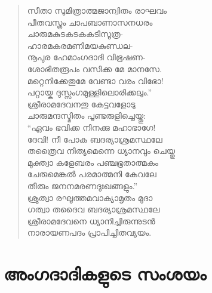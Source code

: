 \begin{verse}
സീതാ സുമിത്രാത്മജാന്വിതം രാഘവം\\
പീതവസ്ത്രം ചാപബാണാസനധരം\\
ചാരുമകുടകടകകടിസൂത്ര-\\
ഹാരമകരമണിമയകുണ്ഡല-\\
നൂപുര ഹേമാംഗദാദി വിഭൂഷണ-\\
ശോഭിതരൂപം വസിക്ക മേ മാനസേ.\\
മറ്റെനിക്കേതുമേ വേണ്ടാ വരം വിഭോ!\\
പറ്റായ്ക ദുസ്സംഗമുള്ളിലൊരിക്കലും.”\\
ശ്രീരാമദേവനതു കേട്ടവളോടു\\
ചാരുമന്ദസ്മിതം പൂണ്ടരുളിച്ചെയ്തു:\\
“ഏവം ഭവിക്ക നിനക്കു മഹാഭാഗേ!\\
ദേവി! നീ പോക ബദര്യാശ്രമസ്ഥലേ\\
തത്രൈവ നിത്യമെന്നെ ധ്യാനവും ചെയ്തു\\
മുക്ത്വാ കളേബരം പഞ്ചഭൂതാത്മകം\\
ചേരുമെങ്കല്‍ പരമാത്മനി കേവലേ\\
തീരും ജനനമരണദുഃഖങ്ങളും.”\\
ശ്രുത്വാ രഘൂത്തമവാക്യാമൃതം മുദാ\\
ഗത്വാ തദൈവ ബദര്യാശ്രമസ്ഥലേ\\
ശ്രീരാമദേവനെ ധ്യാനിച്ചിരുന്നുടന്‍\\
നാരായണപദം പ്രാപിച്ചിതവ്യയം.
\end{verse}


\section{അംഗദാദികളുടെ സംശയം}

